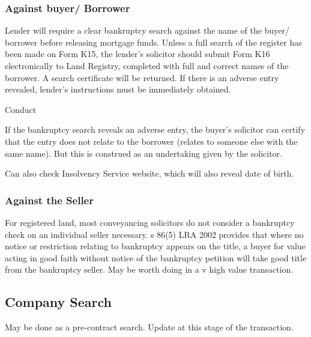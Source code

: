 \documentclass[
]{article}
\newenvironment{env-f5193f51-a35f-4b69-8fd2-a79baa4190c3}
{
    \savenotes\tcolorbox[blanker,breakable,left=5pt,borderline west={2pt}{-4pt}{darksalmon}]
}
{
    \endtcolorbox\spewnotes
}
\begin{document}
\hypertarget{against-buyer-borrower}{%
\subsubsection{Against buyer/ Borrower}\label{against-buyer-borrower}}

Lender will require a clear bankruptcy search against the name of the
buyer/ borrower before releasing mortgage funds. Unless a full search of
the register has been made on Form K15, the lender's solicitor should
submit Form K16 electronically to Land Registry, completed with full and
correct names of the borrower. A search certificate will be returned. If
there is an adverse entry revealed, lender's instructions must be
immediately obtained.

\begin{env-f5193f51-a35f-4b69-8fd2-a79baa4190c3}

Conduct

If the bankruptcy search reveals an adverse entry, the buyer's solicitor
can certify that the entry does not relate to the borrower (relates to
someone else with the same name). But this is construed as an
undertaking given by the solicitor.

\end{env-f5193f51-a35f-4b69-8fd2-a79baa4190c3}

Can also check Insolvency Service website, which will also reveal date
of birth.

\hypertarget{against-the-seller}{%
\subsubsection{Against the Seller}\label{against-the-seller}}

For registered land, most conveyancing solicitors do not consider a
bankruptcy check on an individual seller necessary. s 86(5) LRA 2002
provides that where no notice or restriction relating to bankruptcy
appears on the title, a buyer for value acting in good faith without
notice of the bankruptcy petition will take good title from the
bankruptcy seller. May be worth doing in a v high value transaction.

\hypertarget{company-search}{%
\subsection{Company Search}\label{company-search}}

May be done as a pre-contract search. Update at this stage of the
transaction.
\end{document}
